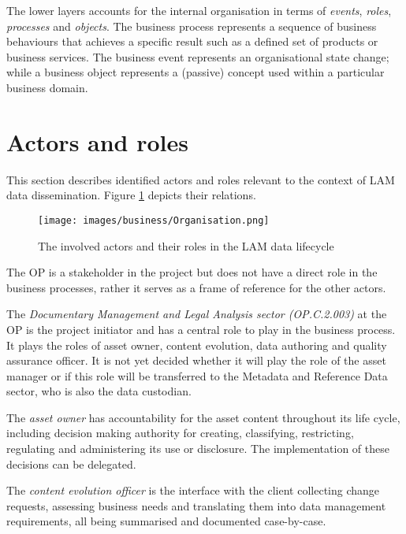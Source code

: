 	The lower layers accounts for the internal organisation in terms of \textit{events}, \textit{roles}, \textit{processes} and \textit{objects}. The business process represents a sequence of business behaviours that achieves a specific result such as a defined set of products or business services. The business event represents an organisational state change; while a business object represents a (passive) concept used within a particular business domain.
	
	\section{Actors and roles}
	\label{sec:actors-roles}
	
	This section describes identified actors and roles relevant to the context of LAM data dissemination. Figure \ref{fig:organisation-structure} depicts their relations.
	
	\begin{figure}[!h]
		\centering
		\texttt{[image: images/business/Organisation.png]}
		\caption{The involved actors and their roles in the LAM data lifecycle}
		\label{fig:organisation-structure}
	\end{figure} 
	
	The OP is a stakeholder in the project but does not have a direct role in the business processes, rather it serves as a frame of reference for the other actors. 
	
	The \textit{Documentary Management and Legal Analysis sector (OP.C.2.003)} at the OP is the project initiator and has a central role to play in the business process. It plays the roles of asset owner, content evolution, data authoring and quality assurance officer. It is not yet decided whether it will play the role of the asset manager or if this role will be transferred to the Metadata and Reference Data sector, who is also the data custodian.
		
	The \textit{asset owner} has accountability for the asset content throughout its life cycle, including decision making authority for creating, classifying, restricting, regulating and administering its use or disclosure. The implementation of these decisions can be delegated.
	
	The \textit{content evolution officer} is the interface with the client collecting change requests, assessing business needs and translating them into data management requirements, all being summarised and documented case-by-case.
	
